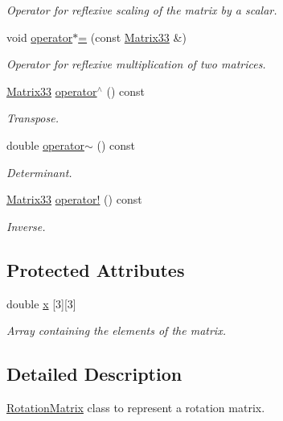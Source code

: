 \begin{DoxyCompactItemize}
\begin{DoxyCompactList}\small\item\em Operator for reflexive scaling of the matrix by a scalar. \end{DoxyCompactList}\item 
void \hyperlink{classMatrix33_ac3937bdeb034cc83b4adcad16cd58a26}{operator$\ast$=} (const \hyperlink{classMatrix33}{Matrix33} \&)
\begin{DoxyCompactList}\small\item\em Operator for reflexive multiplication of two matrices. \end{DoxyCompactList}\item 
\hyperlink{classMatrix33}{Matrix33} \hyperlink{classMatrix33_ad4ab7b9674a44a297502282e1993ef54}{operator$^\wedge$} () const 
\begin{DoxyCompactList}\small\item\em Transpose. \end{DoxyCompactList}\item 
double \hyperlink{classMatrix33_a15b37caa6ab0d9f4a9f0d95846abd675}{operator$\sim$} () const 
\begin{DoxyCompactList}\small\item\em Determinant. \end{DoxyCompactList}\item 
\hyperlink{classMatrix33}{Matrix33} \hyperlink{classMatrix33_a1b822a20343a26b3c9bb7fd5c1247f37}{operator!} () const 
\begin{DoxyCompactList}\small\item\em Inverse. \end{DoxyCompactList}\end{DoxyCompactItemize}
\subsection*{Protected Attributes}
\begin{DoxyCompactItemize}
\item 
double \hyperlink{classMatrix33_af7f01fa466616eb7c8eda2e4d9f85cdd}{x} \mbox{[}3\mbox{]}\mbox{[}3\mbox{]}
\begin{DoxyCompactList}\small\item\em Array containing the elements of the matrix. \end{DoxyCompactList}\end{DoxyCompactItemize}


\subsection{Detailed Description}
\hyperlink{classRotationMatrix}{Rotation\-Matrix} class to represent a rotation matrix. 


